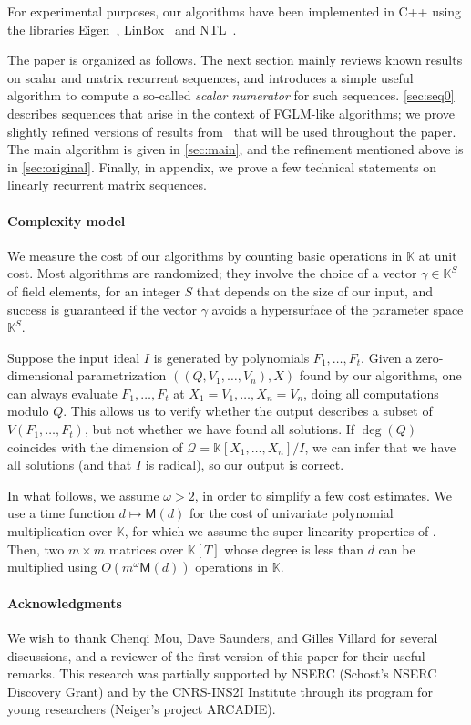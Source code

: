 \documentclass[final,1p,times,authoryear]{elsarticle}
\newcommand{\lf}{X}
\newcommand{\residueI}{\mathscr{Q}}
\newcommand{\sqfree}{Q}
\def\M {\ensuremath{\mathsf{M}}}
\def\K{\mathbb{K}}
\def\K {\ensuremath{\mathbb{K}}}
\begin{document}
For experimental purposes, our algorithms have been implemented in C++ using
the libraries Eigen~\citep{Eigen}, LinBox~\citep{LinBox} and NTL~\citep{NTL}.

The paper is organized as follows. The next section mainly reviews
known results on scalar and matrix recurrent sequences, and introduces
a simple useful algorithm to compute a so-called {\em scalar
  numerator} for such sequences. \cref{sec:seq0} describes sequences
that arise in the context of FGLM-like algorithms; we prove slightly
refined versions of results from~\citep{BoSaSc03} that will be used
throughout the paper. The main algorithm is given in \cref{sec:main},
and the refinement mentioned above is in \cref{sec:original}.
Finally, in appendix, we prove a few technical statements on linearly
recurrent matrix sequences.

\paragraph{Complexity model}
We measure the cost of our algorithms by counting basic operations in
$\K$ at unit cost. Most algorithms are randomized; they involve the
choice of a vector $\gamma \in \K^S$ of field elements, for an integer
$S$ that depends on the size of our input, and success is guaranteed
if the vector $\gamma$ avoids a hypersurface of the parameter space
$\K^S$.

Suppose the input ideal $I$ is generated by polynomials
$F_1,\dots,F_t$.  Given a zero-dimensional parametrization
$((\sqfree,V_1,\dots,V_n),\lf)$ found by our algorithms, one can
always evaluate $F_1,\dots,F_t$ at $X_1 =V_1,\dots,X_n=V_n$, doing all
computations modulo $\sqfree$. This allows us to verify whether the
output describes a subset of $V(F_1,\dots,F_t)$, but not whether we
have found all solutions.  If $\deg(Q)$ coincides with the dimension
of $\residueI=\K[X_1,\dots,X_n]/I$, we can infer that we have all
solutions (and that $I$ is radical), so our output is correct.

In what follows, we assume $\omega>2$, in order to simplify a few cost
estimates. We use a time function $d \mapsto \M(d)$ for the cost of
univariate polynomial multiplication over $\K$, for which we assume
the super-linearity properties of \citep[Section~8.4]{GaGe13}.  Then,
two $m\times m$ matrices over $\K[T]$ whose degree is less than $d$
can be multiplied using $O(m^\omega \M(d))$ operations in $\K$.

\paragraph{Acknowledgments} We wish to thank Chenqi Mou, Dave Saunders, and
Gilles Villard for several discussions, and a reviewer of the first
version of this paper for their useful remarks. This research was
partially supported by NSERC (Schost's NSERC Discovery Grant) and by
the CNRS-INS2I Institute through its program for young researchers
(Neiger's project ARCADIE).
\end{document}
